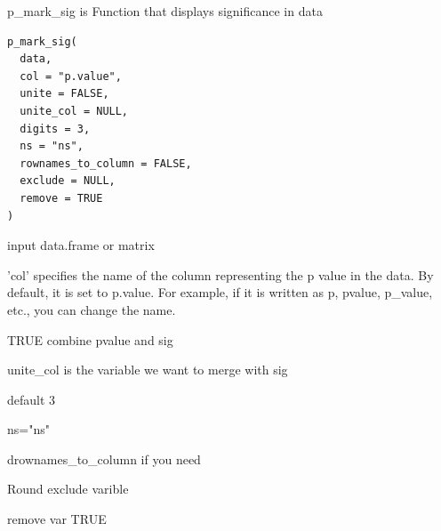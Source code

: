 \documentclass[a4paper]{book}
\begin{document}
%
\begin{Description}
p\_mark\_sig is Function that displays significance in data
\end{Description}
%
\begin{Usage}
\begin{verbatim}
p_mark_sig(
  data,
  col = "p.value",
  unite = FALSE,
  unite_col = NULL,
  digits = 3,
  ns = "ns",
  rownames_to_column = FALSE,
  exclude = NULL,
  remove = TRUE
)
\end{verbatim}
\end{Usage}
%
\begin{Arguments}
\begin{ldescription}
\item[\code{data}] input data.frame or matrix

\item[\code{col}] 'col' specifies the name of the column representing the p value in the data. By default, it is set to p.value. For example, if it is written as p, pvalue, p\_value, etc., you can change the name.

\item[\code{unite}] TRUE combine pvalue and sig

\item[\code{unite\_col}] unite\_col is the variable we want to merge with sig

\item[\code{digits}] default 3

\item[\code{ns}] ns="ns"

\item[\code{rownames\_to\_column}] drownames\_to\_column if you need

\item[\code{exclude}] Round exclude varible

\item[\code{remove}] remove var TRUE
\end{ldescription}
\end{Arguments}
%
\end{document}
